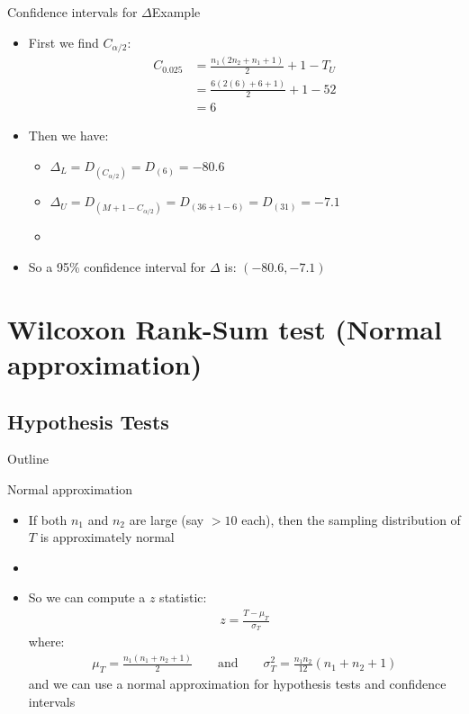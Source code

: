 \documentclass[xcolor=dvipsnames]{beamer}
\begin{document}
\begin{frame}{Confidence intervals for $\Delta$}{Example}
	\begin{itemize}
		\item First we find $C_{\alpha/2}$:
		\begin{align*}
		C_{0.025} &= \frac{n_1 (2n_2 + n_1 + 1)}{2} + 1 - T_U \\
		&= \frac{6 (2(6) + 6 + 1)}{2} + 1 - 52 \\
		&= 6
		\end{align*}
		\item Then we have:
		\begin{itemize}
			\item $\Delta_L = D_{(C_{\alpha / 2})} = D_{(6)} = -80.6$
			\item $\Delta_U = D_{(M + 1 - C_{\alpha / 2})} = D_{(36 +1 - 6)} =D_{(31)} = -7.1$
			\item[]
		\end{itemize}
	\item So a 95\% confidence interval for $\Delta$ is: $(-80.6, -7.1)$
	\end{itemize}
\end{frame}

\section{Wilcoxon Rank-Sum test (Normal approximation)}
\subsection{Hypothesis Tests}
\begin{frame}{Outline}
\tableofcontents[currentsection,subsectionstyle=show/shaded/hide]
\end{frame}

\begin{frame}{Normal approximation}
	\begin{itemize}
		\item If both $n_1$ and $n_2$ are large (say $>10$ each), then the sampling distribution of $T$ is approximately normal
		\item[]
		\item So we can compute a $z$ statistic:
		\begin{gather*}
		z = \frac{T- \mu_T}{\sigma_T}
		\end{gather*}
		where:
		\begin{gather*}
		\mu_T = \frac{n_1 (n_1 + n_2 + 1)}{2} \quad \quad \text{and} \quad \quad \sigma_T^{2} = \frac{n_1 n_2}{12}(n_1 +n_2 +1)
		\end{gather*}
		and we can use a normal approximation for hypothesis tests and confidence intervals
	\end{itemize}
\end{frame}
\end{document}
